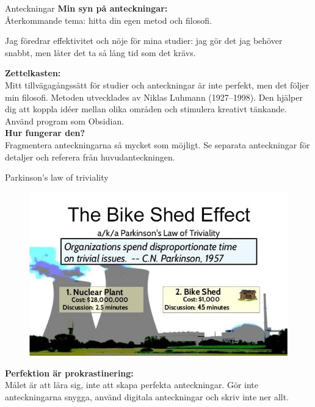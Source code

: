 \documentclass[presentation]{beamer}
\begin{document}
\begin{frame}{Anteckningar}
  \textbf{Min syn på anteckningar:} \\
  Återkommande tema: hitta din egen metod och filosofi.

  Jag föredrar effektivitet och nöje för mina studier: jag gör det jag behöver snabbt, men låter det ta så lång tid som det krävs.


  \textbf{Zettelkasten:} \\
  Mitt tillvägagångssätt för studier och anteckningar är inte perfekt, men det följer min filosofi. Metoden utvecklades av Niklas Luhmann (1927–1998). Den hjälper dig att koppla idéer mellan olika områden och stimulera kreativt tänkande. Använd program som Obsidian. \\
  \textbf{Hur fungerar den?} \\
  Fragmentera anteckningarna så mycket som möjligt. Se separata anteckningar för detaljer och referera från huvudanteckningen. \\

\end{frame}

  \begin{frame}{Parkinson's law of triviality}

   \begin{figure}
    \centering
    \includegraphics[width=0.7\linewidth]{images/bike_shed_effect.png}
  \end{figure}


  \textbf{Perfektion är prokrastinering:} \\
  Målet är att lära sig, inte att skapa perfekta anteckningar. Gör inte anteckningarna snygga, använd digitala anteckningar och skriv inte ner allt.
\end{frame}
\end{document}
